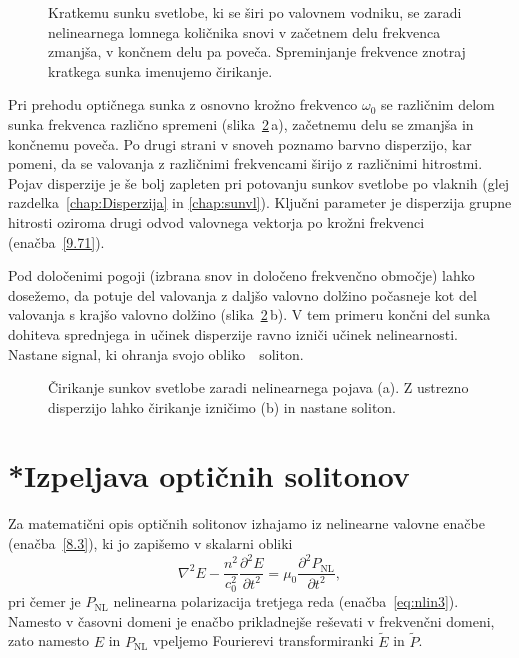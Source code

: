 \begin{figure}[ht]
\centering
\def\svgwidth{70truemm} 

\caption{Kratkemu sunku svetlobe, ki se širi po valovnem vodniku, se zaradi nelinearnega 
lomnega količnika snovi v začetnem delu frekvenca zmanjša, v končnem delu pa poveča.
Spreminjanje frekvence znotraj kratkega sunka imenujemo čirikanje.}
\label{fig:optsoliton}
\end{figure}
Pri prehodu optičnega sunka z osnovno krožno frekvenco $\omega_0$ se različnim delom sunka
frekvenca različno spremeni (slika~\ref{fig:chirp}\,a), začetnemu delu se zmanjša in 
končnemu poveča. Po drugi strani v snoveh poznamo barvno disperzijo, 
kar pomeni, da se valovanja z različnimi frekvencami širijo z različnimi hitrostmi.
 Pojav disperzije je še bolj zapleten pri potovanju sunkov svetlobe po vlaknih
(glej razdelka~\ref{chap:Disperzija} in \ref{chap:sunvl}). Ključni parameter je disperzija 
grupne hitrosti oziroma drugi odvod valovnega vektorja po krožni frekvenci (enačba~\ref{9.71}).

Pod določenimi pogoji (izbrana snov in določeno frekvenčno območje) 
lahko dosežemo, da potuje del valovanja z daljšo valovno dolžino počasneje kot del valovanja
s krajšo valovno dolžino (slika~\ref{fig:chirp}\,b). V tem primeru končni del sunka 
dohiteva sprednjega in učinek disperzije ravno izniči učinek nelinearnosti. 
Nastane signal, ki ohranja svojo obliko~\textendash~soliton. 
\begin{figure}[ht]
\centering
\def\svgwidth{145truemm} 

\caption{Čirikanje sunkov svetlobe zaradi nelinearnega pojava (a). Z ustrezno disperzijo lahko
čirikanje izničimo (b) in nastane soliton.}
\label{fig:chirp}
\end{figure}

\section{*Izpeljava optičnih solitonov}
Za matematični opis optičnih solitonov izhajamo iz nelinearne 
valovne enačbe (enačba~\ref{8.3}), ki jo zapišemo v skalarni obliki
\begin{equation}
\nabla^{2}E-\frac{n^2}{c_0^{2}}{\frac{\partial^2 E}{\partial t^2}}=
\mu_{0}{\frac{\partial^2P_{\textrm{NL}}}{\partial t^2}},
\end{equation}
pri čemer je 
$P_\textrm{NL}$ nelinearna polarizacija tretjega reda (enačba~\ref{eq:nlin3}).
Namesto v časovni domeni je enačbo prikladnejše reševati v frekvenčni domeni, zato
namesto $E$ in $P_{\mathrm{NL}}$ vpeljemo Fourierevi transformiranki $\tilde{E}$ in $\tilde{P}$.

